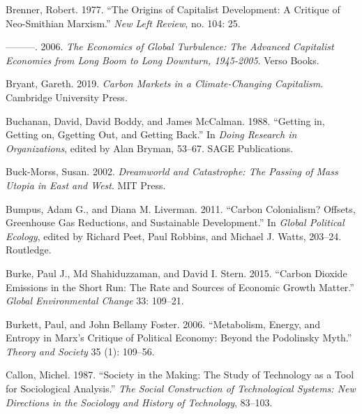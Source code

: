 \documentclass[a4paper, nobind]{templates/ociamthesis}
\newlength{\cslhangindent}
\newenvironment{CSLReferences}[2] %
 {%
  \setlength{\parindent}{0pt}
  \ifodd #1
  \let\oldpar\par
  \def\par{\hangindent=\cslhangindent\oldpar}
  \fi
  \setlength{\parskip}{1mm}
  \setlength{\baselineskip}{6mm}
 }%
 {}
\begin{document}
\begin{CSLReferences}{1}{0}
\leavevmode{}%
Brenner, Robert. 1977. {``The Origins of Capitalist Development: A Critique of Neo-{Smithian Marxism}.''} \emph{New Left Review}, no. 104: 25.

\leavevmode{}%
---------. 2006. \emph{The {Economics} of {Global Turbulence}: {The Advanced Capitalist Economies} from {Long Boom} to {Long Downturn}, 1945-2005}. {Verso Books}.

\leavevmode{}%
Bryant, Gareth. 2019. \emph{Carbon {Markets} in a {Climate-Changing Capitalism}}. {Cambridge University Press}.

\leavevmode{}%
Buchanan, David, David Boddy, and James McCalman. 1988. {``Getting in, {Getting} on, {Ggetting} Out, and {Getting} Back.''} In \emph{Doing {Research} in {Organizations}}, edited by Alan Bryman, 53--67. {SAGE Publications}.

\leavevmode{}%
Buck-Morss, Susan. 2002. \emph{Dreamworld and {Catastrophe}: {The Passing} of {Mass Utopia} in {East} and {West}}. {MIT Press}.

\leavevmode{}%
Bumpus, Adam G., and Diana M. Liverman. 2011. {``Carbon Colonialism? {Offsets}, Greenhouse Gas Reductions, and Sustainable Development.''} In \emph{Global {Political Ecology}}, edited by Richard Peet, Paul Robbins, and Michael J. Watts, 203--24. {Routledge}.

\leavevmode{}%
Burke, Paul J., Md Shahiduzzaman, and David I. Stern. 2015. {``Carbon Dioxide Emissions in the Short Run: {The} Rate and Sources of Economic Growth Matter.''} \emph{Global Environmental Change} 33: 109--21.

\leavevmode{}%
Burkett, Paul, and John Bellamy Foster. 2006. {``Metabolism, Energy, and Entropy in {Marx}'s Critique of Political Economy: {Beyond} the {Podolinsky} Myth.''} \emph{Theory and Society} 35 (1): 109--56.

\leavevmode{}%
Callon, Michel. 1987. {``Society in the Making: The Study of Technology as a Tool for Sociological Analysis.''} \emph{The Social Construction of Technological Systems: New Directions in the Sociology and History of Technology}, 83--103.


\end{CSLReferences}
\end{document}
